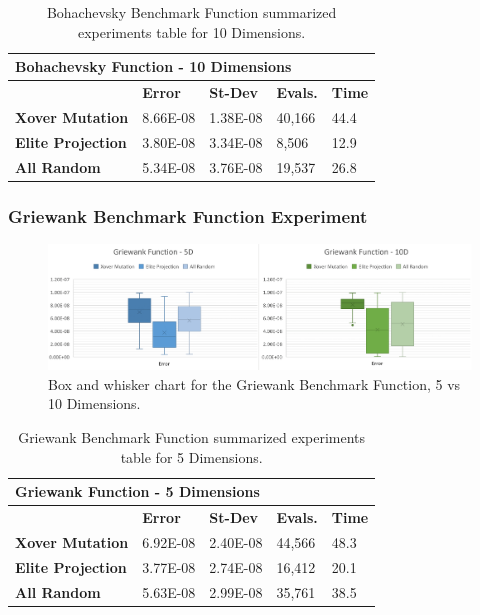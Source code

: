 \documentclass[graybox]{svmult}
\begin{document}
\begin{table}[]
    \scriptsize
    \centering
    \caption{Bohachevsky Benchmark Function summarized experiments table for 10 Dimensions.}\label{tab.fun_bohachevsky10}
    \begin{tabular}{@{}lllll@{}}
    \toprule
    \multicolumn{5}{l}{\textbf{Bohachevsky Function - 10 Dimensions}} \\ \midrule
     & \textbf{Error} & \textbf{St-Dev} & \textbf{Evals.} & \textbf{Time} \\
    \textbf{Xover Mutation} & 8.66E-08 & 1.38E-08 & 40,166 & 44.4 \\
    \textbf{Elite Projection} & 3.80E-08 & 3.34E-08 & 8,506 & 12.9 \\
    \textbf{All Random} & 5.34E-08 & 3.76E-08 & 19,537 & 26.8 \\ \bottomrule
    \end{tabular}
    \end{table}


\subsubsection{Griewank Benchmark Function Experiment}

\begin{figure}
    \includegraphics[width=\linewidth, frame]{img/fig_fun_griewank.pdf}
    \caption{Box and whisker chart for the Griewank Benchmark Function, 5 vs 10 Dimensions.} \label{fig.fun_griewank}
    \end{figure}

\begin{table}[]
    \scriptsize
    \centering
    \caption{Griewank Benchmark Function summarized experiments table for 5 Dimensions.}\label{tab.fun_griewank5}
    \begin{tabular}{@{}lllll@{}}
    \toprule
    \multicolumn{5}{l}{\textbf{Griewank Function - 5 Dimensions}} \\ \midrule
     & \textbf{Error} & \textbf{St-Dev} & \textbf{Evals.} & \textbf{Time} \\
    \textbf{Xover Mutation} & 6.92E-08 & 2.40E-08 & 44,566 & 48.3 \\
    \textbf{Elite Projection} & 3.77E-08 & 2.74E-08 & 16,412 & 20.1 \\
    \textbf{All Random} & 5.63E-08 & 2.99E-08 & 35,761 & 38.5 \\ \bottomrule
    \end{tabular}
    \end{table}
\end{document}

